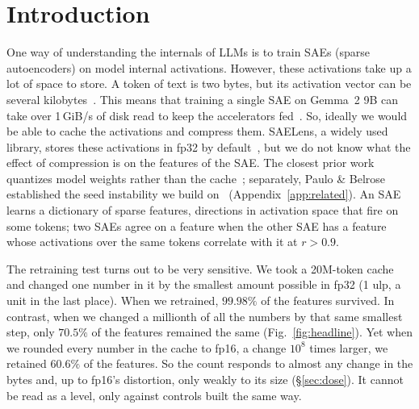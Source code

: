 \documentclass{article}
\begin{document}
\section{Introduction}
\label{sec:intro}

One way of understanding the internals of LLMs is to train SAEs (sparse
autoencoders) on model internal activations. However, these activations
take up a lot of space to store. A token of text is two bytes, but its
activation vector can be several kilobytes~\citep{llamascope}. This
means that training a single SAE on Gemma~2 9B can take over 1\,GiB/s
of disk read to keep the accelerators fed~\citep{gemmascope}. So, ideally we would be able
to cache the activations and compress them. SAELens, a widely used
library, stores these activations in fp32 by default~\citep{saelens}, but we
do not know what the effect of compression is on the features of the
SAE.
The closest prior work quantizes model weights rather than the
cache~\citep{duan}; separately, Paulo \& Belrose established the seed
instability we build on~\citep{paulo} (Appendix~\ref{app:related}).
An SAE learns a dictionary of sparse features, directions in
activation space that fire on some tokens; two SAEs agree on a feature
when the other SAE has a feature whose activations over the same
tokens correlate with it at $r > 0.9$.

The retraining test turns out to be very sensitive. We took a
20M-token cache and changed one number in it by the smallest amount
possible in fp32 (1 ulp, a unit in the last place). When we
retrained, $99.98\%$ of the features survived. In contrast, when we
changed a millionth of all the numbers by that same smallest step, only
$70.5\%$ of the features remained the same (Fig.~\ref{fig:headline}). Yet when we rounded every
number in the cache to fp16, a change $10^8$ times larger, we retained
$60.6\%$ of the features. So the count responds to almost any change in the bytes and,
up to fp16's distortion, only weakly to its size (\S\ref{sec:dose}).
It cannot be read
as a level, only against controls built the same way.
\end{document}
